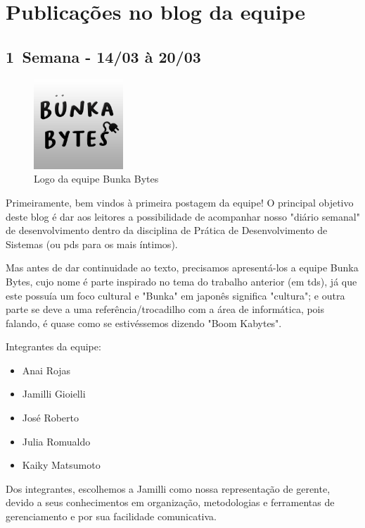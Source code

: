 \chapter{Publicações no blog da equipe}
\label{postsBlog}

\section{1\textordfeminine \, Semana - 14/03 à 20/03}

\begin{figure}[htb]
\centering
\caption{Logo da equipe Bunka Bytes}
\includegraphics[width=0.3\textwidth]{anexos/Imagens_Blog/LogoBunkaPDS.png}
\end{figure}
\FloatBarrier

Primeiramente, bem vindos à primeira postagem da equipe! O principal objetivo deste blog é dar aos leitores a possibilidade de acompanhar nosso "diário semanal" de desenvolvimento dentro da disciplina de Prática de Desenvolvimento de Sistemas (ou \acs{pds} para os mais íntimos).

Mas antes de dar continuidade ao texto, precisamos apresentá-los a equipe Bunka Bytes, cujo nome é parte inspirado no tema do trabalho anterior (em \acs{tds}), já que este possuía um foco cultural e "Bunka" em japonês significa "cultura"; e outra parte se deve a uma referência/trocadilho com a área de informática, pois falando, é quase como se estivéssemos dizendo "Boom Kabytes". 

Integrantes da equipe:

\begin{itemize}
    \item Anai Rojas
    \item Jamilli Gioielli
    \item José Roberto
    \item Julia Romualdo
    \item Kaiky Matsumoto
\end{itemize}

Dos integrantes, escolhemos a Jamilli como nossa representação de gerente, devido a seus conhecimentos em organização, metodologias e ferramentas de gerenciamento e por sua facilidade comunicativa. 

